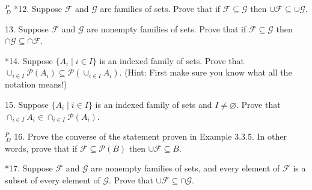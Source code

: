 \documentclass{article}
\begin{document}
\vspace{30pt}

$^{\textit{P}}_{\, \textit{D}}$ *12. Suppose $\mathcal{F}$ and $\mathcal{G}$ are families of sets. Prove that if $\mathcal{F} \subseteq \mathcal{G}$ then $\cup \mathcal{F} \subseteq \cup\mathcal{G}$.
\vspace{30pt}



\vspace{30pt}

13. Suppose $\mathcal{F}$ and $\mathcal{G}$ are nonempty families of sets. Prove that if $\mathcal{F} \subseteq \mathcal{G}$ then $\cap \mathcal{G} \subseteq \cap\mathcal{F}$.
\vspace{30pt}



\vspace{30pt}

*14. Suppose $\{A_i \mid i \in I\}$ is an indexed family of sets. Prove that
$\cup_{i \in I}\mathcal{P} (A_i) \subseteq \mathcal{P} (\cup_{i \in I} A_i).$ (Hint: First make sure you know what all
the notation means!)
\vspace{30pt}



\vspace{30pt}

15. Suppose $\{A_i \mid i \in I\}$ is an indexed family of sets and $I \neq \varnothing$. Prove that
$\cap_{i \in I} A_i \in \cap_{i \in I} \mathcal{P} (A_i)$.
\vspace{30pt}



\vspace{30pt}

$^{\textit{P}}_{\, \textit{D}}$ 16. Prove the converse of the statement proven in Example 3.3.5. In other
words, prove that if $\mathcal{F} \subseteq \mathcal{P} (B)$ then $\cup \mathcal{F} \subseteq B$.
\vspace{30pt}



\vspace{30pt}

*17. Suppose $\mathcal{F}$ and $\mathcal{G}$ are nonempty families of sets, and every element of
$\mathcal{F}$ is a subset of every element of $\mathcal{G}$. Prove that $\cup \mathcal{F} \subseteq \cap \mathcal{G}$.
\vspace{30pt}



\vspace{30pt}
\end{document}
